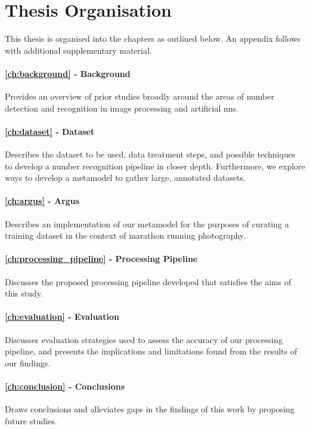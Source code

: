 \section{Thesis Organisation}
\label{sec:introduction:organisation}

This thesis is organised into the chapters as outlined below. An appendix follows with additional supplementary material.

\paragraph{\cref{ch:background} - Background} Provides an overview of prior studies broadly around the areas of number detection and recognition in image processing and artificial \glspl{nn}.

\paragraph{\cref{ch:dataset} - Dataset} Describes the dataset to be used, data treatment steps, and possible techniques to develop a number recognition pipeline in closer depth. Furthermore, we explore ways to develop a metamodel to gather large, annotated datasets.

\paragraph{\cref{ch:argus} - Argus} Describes an implementation of our metamodel for the purposes of curating a training dataset in the context of marathon running photography.

\paragraph{\cref{ch:processing_pipeline} - Processing Pipeline} Discusses the proposed processing pipeline developed that satisfies the aims of this study.

\paragraph{\cref{ch:evaluation} - Evaluation} Discusses evaluation strategies used to assess the accuracy of our processing pipeline, and presents the implications and limitations found from the results of our findings.

\paragraph{\cref{ch:conclusion} - Conclusions} Draws conclusions and alleviates gaps in the findings of this work by proposing future studies.